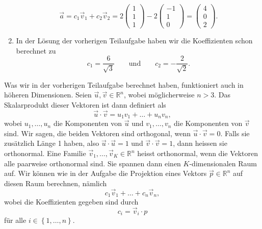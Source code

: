 \begin{losung*}
\begin{enumerate}[label=(\alph*)]
		\begin{equation*}
			\vec a
			=c_1\vec v_1+c_2\vec v_2
			=2\begin{pmatrix}
				1 \\ 1 \\ 1
			\end{pmatrix}
			-2\begin{pmatrix}
				-1 \\ 1 \\ 0
			\end{pmatrix}
			=\begin{pmatrix}
				4 \\ 0 \\ 2
			\end{pmatrix}.
		\end{equation*}
		\item In der Lösung der vorherigen Teilaufgabe haben wir die Koeffizienten schon berechnet zu
		\begin{equation*}
			c_1=\frac{6}{\sqrt{3}}
			\quad\quad\text{und}\quad\quad
			c_2=-\frac{2}{\sqrt{2}}.
		\end{equation*}
	\end{enumerate}
\end{losung*}

Was wir in der vorherigen Teilaufgabe berechnet haben, funktioniert auch in höheren Dimensionen.
Seien $\vec u,\vec v\in\mathbb R^n$, wobei möglicherweise $n>3$.
Das Skalarprodukt dieser Vektoren ist dann definiert als
\begin{equation*}
	\vec u\cdot\vec v=u_1v_1+\ldots+u_nv_n,
\end{equation*}
wobei $u_1,\ldots,u_n$ die Komponenten von $\vec u$ und $v_1,\ldots,v_n$ die Komponenten von $\vec v$ sind.
Wir sagen, die beiden Vektoren sind orthogonal, wenn $\vec u\cdot\vec v=0$.
Falls sie zusätzlich Länge 1 haben, also $\vec u\cdot\vec u=1$ und $\vec v\cdot\vec v=1$, dann heissen sie orthonormal.
Eine Familie $\vec v_1,\ldots,\vec v_K\in\mathbb R^n$ heisst orthonormal, wenn die Vektoren alle paarweise orthonormal sind.
Sie spannen dann einen $K$-dimensionalen Raum auf.
Wir können wie in der Aufgabe die Projektion eines Vektors $\vec p\in\mathbb R^n$ auf diesen Raum berechnen, nämlich
\begin{equation*}
	c_1\vec v_1+\ldots+c_n\vec v_n,
\end{equation*}
wobei die Koeffizienten gegeben sind durch
\begin{equation*}
	c_i=\vec v_i\cdot p
\end{equation*}
für alle $i\in\left\{1,\ldots,n\right\}$.

